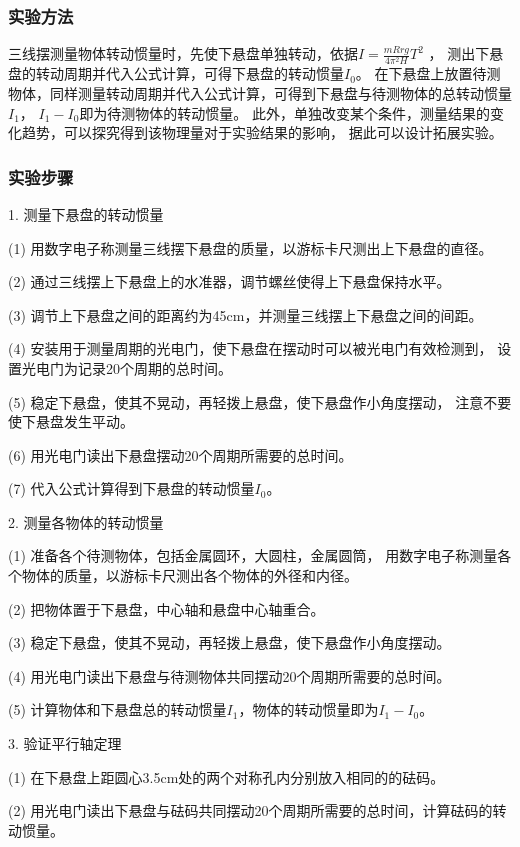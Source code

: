 \documentclass[12pt,hyperref,a4paper,UTF8]{ctexart}
\begin{document}
\subsubsection{实验方法}

三线摆测量物体转动惯量时，先使下悬盘单独转动，依据$ I = \frac{mRrg}{4 {\pi}^2 H} T^2 $ ，
测出下悬盘的转动周期并代入公式计算，可得下悬盘的转动惯量$I_0$。
在下悬盘上放置待测物体，同样测量转动周期并代入公式计算，可得到下悬盘与待测物体的总转动惯量$I_1$，
$I_1-I_0$即为待测物体的转动惯量。
此外，单独改变某个条件，测量结果的变化趋势，可以探究得到该物理量对于实验结果的影响，
据此可以设计拓展实验。

\subsubsection{实验步骤}

1. 测量下悬盘的转动惯量

(1) 用数字电子称测量三线摆下悬盘的质量，以游标卡尺测出上下悬盘的直径。

(2) 通过三线摆上下悬盘上的水准器，调节螺丝使得上下悬盘保持水平。

(3) 调节上下悬盘之间的距离约为45cm，并测量三线摆上下悬盘之间的间距。

(4) 安装用于测量周期的光电门，使下悬盘在摆动时可以被光电门有效检测到，
设置光电门为记录20个周期的总时间。

(5) 稳定下悬盘，使其不晃动，再轻拨上悬盘，使下悬盘作小角度摆动，
注意不要使下悬盘发生平动。

(6) 用光电门读出下悬盘摆动20个周期所需要的总时间。

(7) 代入公式计算得到下悬盘的转动惯量$ I_0 $。

2. 测量各物体的转动惯量

(1) 准备各个待测物体，包括金属圆环，大圆柱，金属圆筒，
用数字电子称测量各个物体的质量，以游标卡尺测出各个物体的外径和内径。

(2) 把物体置于下悬盘，中心轴和悬盘中心轴重合。

(3) 稳定下悬盘，使其不晃动，再轻拨上悬盘，使下悬盘作小角度摆动。

(4) 用光电门读出下悬盘与待测物体共同摆动20个周期所需要的总时间。

(5) 计算物体和下悬盘总的转动惯量$ I_1 $，物体的转动惯量即为$ I_1 - I_0 $。

3. 验证平行轴定理

(1) 在下悬盘上距圆心3.5cm处的两个对称孔内分别放入相同的的砝码。

(2) 用光电门读出下悬盘与砝码共同摆动20个周期所需要的总时间，计算砝码的转动惯量。
\end{document}

